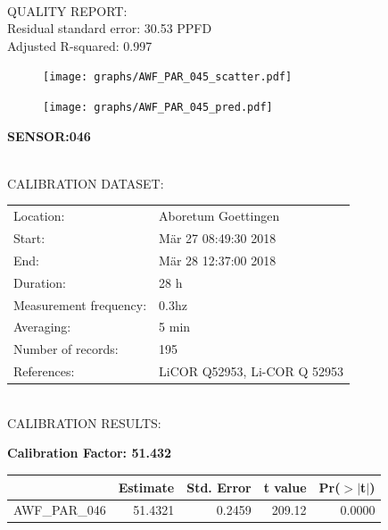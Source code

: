 \documentclass[oneside]{report}
\begin{document}
\hrulefill\\
QUALITY REPORT:\\
Residual standard error: 30.53 PPFD\\
Adjusted R-squared: 0.997



\begin{figure}[H]
  \centering
  \texttt{[image: graphs/AWF\_PAR\_045\_scatter.pdf]}
\end{figure}




\begin{figure}[H]
  \centering
  \texttt{[image: graphs/AWF\_PAR\_045\_pred.pdf]}
\end{figure}

\pagebreak


\begin{center}
\large{\textbf{SENSOR:046}}\\
\end{center}

\hrulefill\\
CALIBRATION DATASET:\\
\begin{table}[h!]
  \centering
  \label{tab:table1}
  \begin{tabular}{ll}
    Location: & Aboretum Goettingen\\ 
    
    
    Start:  & Mär 27 08:49:30 2018 \\
    End:   & Mär 28 12:37:00 2018\\ 
    Duration: & 28 h\\
    Measurement frequency: & 0.3hz\\
    Averaging:  &5 min\\
    Number of records: & 195 \\
    References: & LiCOR Q52953, Li-COR Q 52953 \\
  \end{tabular}
\end{table}

\hrulefill\\
CALIBRATION RESULTS:\\


\begin{center}
\textbf{\large{Calibration Factor: 51.432}}\\
\end{center}
\begin{table}[ht]
\centering
\begin{tabular}{rrrrr}
  \hline
 & Estimate & Std. Error & t value & Pr($>$$|$t$|$) \\ 
  \hline
AWF\_PAR\_046 & 51.4321 & 0.2459 & 209.12 & 0.0000 \\ 
   \hline
\end{tabular}
\end{table}
\end{document}
